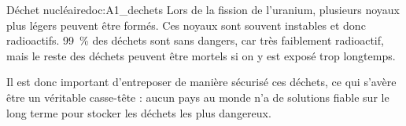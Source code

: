 \begin{doc}{Déchet nucléaire}{doc:A1_dechets}
  Lors de la fission de l'uranium, plusieurs noyaux plus légers peuvent être formés.
  Ces noyaux sont souvent instables et donc radioactifs.
  \qty{99}{\percent} des déchets sont sans dangers, car très faiblement radioactif, mais le reste des déchets peuvent être mortels si on y est exposé trop longtemps.
  
  Il est donc important d'entreposer de manière sécurisé ces déchets, ce qui s'avère être un véritable casse-tête : aucun pays au monde n'a de solutions fiable sur le long terme pour stocker les déchets les plus dangereux.
\end{doc}


